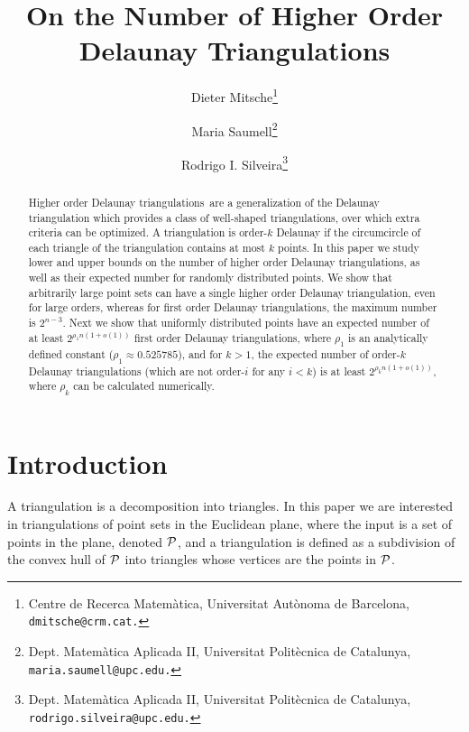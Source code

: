 \documentclass {journal}
\newcommand{\Pts}{\cal P}
\newcommand {\hodt}{higher order Delaunay triangulation}
\newcommand {\hodts}{higher order Delaunay triangulations}
\newcommand {\Hodts}{Higher order Delaunay triangulations}
\newcommand {\fodts}{first order Delaunay triangulations}
\begin{document}
\title{On the Number of Higher Order Delaunay Triangulations}


\author{Dieter Mitsche\thanks{Centre de Recerca Matem\`{a}tica, Universitat Aut\`{o}noma de Barcelona,
  \tt{dmitsche@crm.cat}.}
\and
Maria Saumell\thanks{Dept. Matem\`{a}tica Aplicada II, Universitat Polit\`{e}cnica de Catalunya,
   \tt{maria.saumell@upc.edu}.}
\and
Rodrigo I. Silveira\thanks{Dept. Matem\`{a}tica Aplicada II, Universitat Polit\`{e}cnica de Catalunya,
   \tt{rodrigo.silveira@upc.edu}.}
}



\maketitle

\begin{abstract}
\Hodts\ are a generalization of the Delaunay triangulation which
provides a class of well-shaped triangulations, over which extra
criteria can be optimized. A triangulation is order-$k$ Delaunay
if the circumcircle of each triangle of the triangulation contains
at most $k$ points. In this paper we study lower and upper bounds
on the number of \hodts,  as well as their expected number for
randomly distributed points. We show that arbitrarily large point
sets can have a single \hodt, even for large orders, whereas for
\fodts, the maximum number is $2^{n-3}$. Next we show that
uniformly distributed points have an expected number of at least
$2^{\rho_1 n(1+o(1))}$  \fodts, where $\rho_1$ is an analytically
defined constant ($\rho_1 \approx 0.525785$), and for $k > 1$, the
expected number of order-$k$ Delaunay triangulations (which are
not order-$i$ for any $i < k$) is at least $2^{\rho_k n(1+o(1))}$,
where $\rho_k$ can be calculated numerically.
\end{abstract}

 \section{Introduction}

A triangulation is a decomposition into triangles. In this paper
we are interested in triangulations of point sets in the Euclidean
plane, where the input is a set of points in the plane, denoted
$\Pts$, and a triangulation is defined as a subdivision of the
convex hull of $\Pts$ into triangles whose vertices are the points
in $\Pts$.
\end{document}

